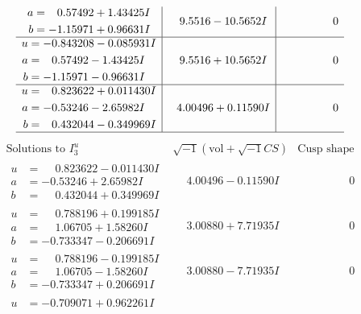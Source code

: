\documentclass[1p]{elsarticle_modified}
\theoremstyle{definition}
\newcommand{\I}{\sqrt{-1}}
\begin{document}
$$\begin{array}{c|c|c}
\begin{aligned}
a &= \phantom{-}0.57492 + 1.43425 I \\
b &= -1.15971 + 0.96631 I\end{aligned}
 & \phantom{-}9.5516 - 10.5652 I & \phantom{-0.000000 } 0 \\ \hline\begin{aligned}
u &= -0.843208 - 0.085931 I \\
a &= \phantom{-}0.57492 - 1.43425 I \\
b &= -1.15971 - 0.96631 I\end{aligned}
 & \phantom{-}9.5516 + 10.5652 I & \phantom{-0.000000 } 0 \\ \hline\begin{aligned}
u &= \phantom{-}0.823622 + 0.011430 I \\
a &= -0.53246 - 2.65982 I \\
b &= \phantom{-}0.432044 - 0.349969 I\end{aligned}
 & \phantom{-}4.00496 + 0.11590 I & \phantom{-0.000000 } 0\\
 \hline 
 \end{array}$$\newpage$$\begin{array}{c|c|c}  
\text{Solutions to }I^u_{3}& \I (\text{vol} + \sqrt{-1}CS) & \text{Cusp shape}\\
 \hline 
\begin{aligned}
u &= \phantom{-}0.823622 - 0.011430 I \\
a &= -0.53246 + 2.65982 I \\
b &= \phantom{-}0.432044 + 0.349969 I\end{aligned}
 & \phantom{-}4.00496 - 0.11590 I & \phantom{-0.000000 } 0 \\ \hline\begin{aligned}
u &= \phantom{-}0.788196 + 0.199185 I \\
a &= \phantom{-}1.06705 + 1.58260 I \\
b &= -0.733347 - 0.206691 I\end{aligned}
 & \phantom{-}3.00880 + 7.71935 I & \phantom{-0.000000 } 0 \\ \hline\begin{aligned}
u &= \phantom{-}0.788196 - 0.199185 I \\
a &= \phantom{-}1.06705 - 1.58260 I \\
b &= -0.733347 + 0.206691 I\end{aligned}
 & \phantom{-}3.00880 - 7.71935 I & \phantom{-0.000000 } 0 \\ \hline\begin{aligned}
u &= -0.709071 + 0.962261 I \\

\end{aligned}
\end{array}$$
\end{document}
